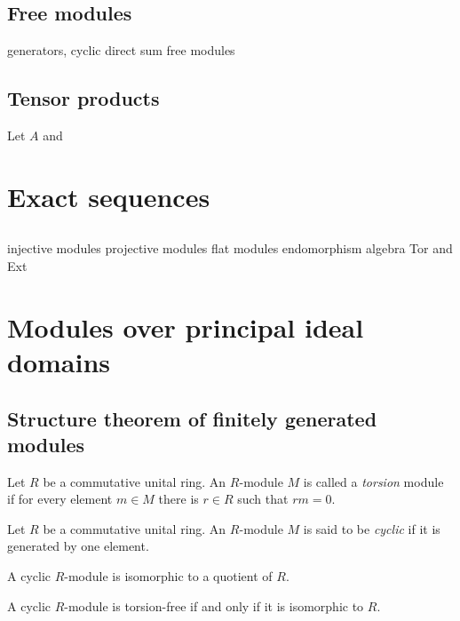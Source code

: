 \documentclass{../../large}
\begin{document}
\section{Free modules}
generators, cyclic
direct sum
free modules

\section{Tensor products}


\begin{prb}
Let $A$ and

\end{prb}


\chapter{Exact sequences}
\section{}
injective modules
projective modules
flat modules
endomorphism algebra
Tor and Ext






\chapter{Modules over principal ideal domains}
\section{Structure theorem of finitely generated modules}

\begin{prb}
Let $R$ be a commutative unital ring.
An $R$-module $M$ is called a \emph{torsion} module if
for every element $m\in M$ there is $r\in R$ such that $rm=0$.
\end{prb}

\begin{prb}
Let $R$ be a commutative unital ring.
An $R$-module $M$ is said to be \emph{cyclic} if it is generated by one element.
\begin{parts}
\item A cyclic $R$-module is isomorphic to a quotient of $R$.
\item A cyclic $R$-module is torsion-free if and only if it is isomorphic to $R$.
\end{parts}
\end{prb}
\end{document}
